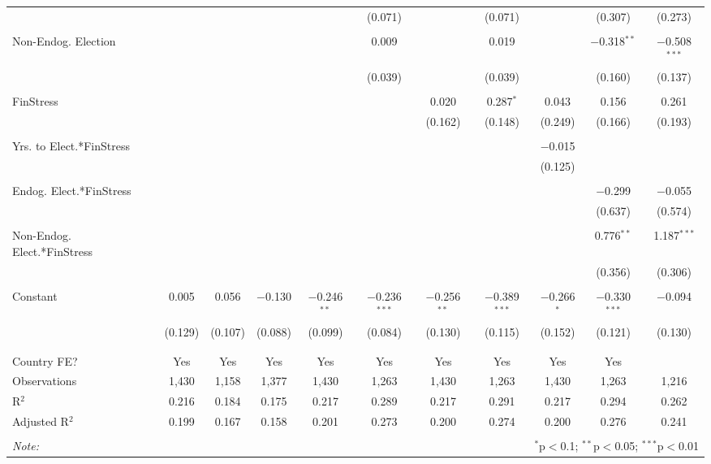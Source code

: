 \begin{table}[!htbp]
\begin{tabular}{@{\extracolsep{5pt}}lcccccccccc}
  &  &  &  &  & (0.071) &  & (0.071) &  & (0.307) & (0.273) \\ 
  & & & & & & & & & & \\ 
 Non-Endog. Election &  &  &  &  & 0.009 &  & 0.019 &  & $-$0.318$^{**}$ & $-$0.508$^{***}$ \\ 
  &  &  &  &  & (0.039) &  & (0.039) &  & (0.160) & (0.137) \\ 
  & & & & & & & & & & \\ 
 FinStress &  &  &  &  &  & 0.020 & 0.287$^{*}$ & 0.043 & 0.156 & 0.261 \\ 
  &  &  &  &  &  & (0.162) & (0.148) & (0.249) & (0.166) & (0.193) \\ 
  & & & & & & & & & & \\ 
 Yrs. to Elect.*FinStress &  &  &  &  &  &  &  & $-$0.015 &  &  \\ 
  &  &  &  &  &  &  &  & (0.125) &  &  \\ 
  & & & & & & & & & & \\ 
 Endog. Elect.*FinStress &  &  &  &  &  &  &  &  & $-$0.299 & $-$0.055 \\ 
  &  &  &  &  &  &  &  &  & (0.637) & (0.574) \\ 
  & & & & & & & & & & \\ 
 Non-Endog. Elect.*FinStress &  &  &  &  &  &  &  &  & 0.776$^{**}$ & 1.187$^{***}$ \\ 
  &  &  &  &  &  &  &  &  & (0.356) & (0.306) \\ 
  & & & & & & & & & & \\ 
 Constant & 0.005 & 0.056 & $-$0.130 & $-$0.246$^{**}$ & $-$0.236$^{***}$ & $-$0.256$^{**}$ & $-$0.389$^{***}$ & $-$0.266$^{*}$ & $-$0.330$^{***}$ & $-$0.094 \\ 
  & (0.129) & (0.107) & (0.088) & (0.099) & (0.084) & (0.130) & (0.115) & (0.152) & (0.121) & (0.130) \\ 
  & & & & & & & & & & \\ 
\hline \\[-1.8ex] 
Country FE? & Yes & Yes & Yes & Yes & Yes & Yes & Yes & Yes & Yes &  \\ 
Observations & 1,430 & 1,158 & 1,377 & 1,430 & 1,263 & 1,430 & 1,263 & 1,430 & 1,263 & 1,216 \\ 
R$^{2}$ & 0.216 & 0.184 & 0.175 & 0.217 & 0.289 & 0.217 & 0.291 & 0.217 & 0.294 & 0.262 \\ 
Adjusted R$^{2}$ & 0.199 & 0.167 & 0.158 & 0.201 & 0.273 & 0.200 & 0.274 & 0.200 & 0.276 & 0.241 \\ 
\hline 
\hline \\[-1.8ex] 
\textit{Note:}  & \multicolumn{10}{r}{$^{*}$p$<$0.1; $^{**}$p$<$0.05; $^{***}$p$<$0.01} \\ 
\end{tabular} 
\end{table} 
